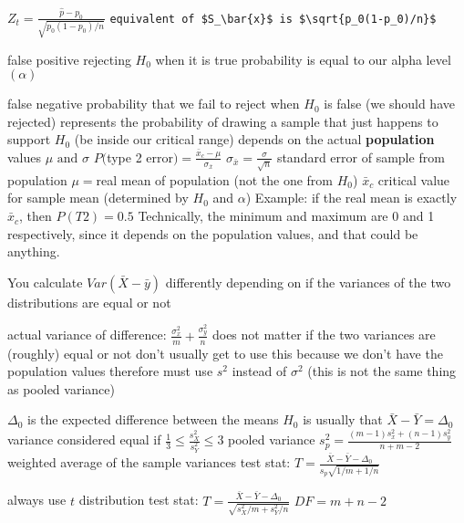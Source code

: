 \documentclass{article}
\begin{document}
\begin{multicols*}{2}
\begin{outline}[compactitem]
  \1 $Z_t=\frac{\hat{p}-p_0}{\sqrt{p_0(1-p_0)/n}}$
  \1 \verb|equivalent of $S_\bar{x}$ is $\sqrt{p_0(1-p_0)/n}$|

  \1 false positive
  \1 rejecting $H_0$ when it is true
  \1 probability is equal to our alpha level $(\alpha)$

  \1 false negative
  \1 probability that we fail to reject when $H_0$ is false (we should have rejected)
  \1 represents the probability of drawing a sample that just happens to support $H_0$ (be inside our critical range)
  \1 depends on the actual \textbf{population} values $\mu\mbox{ and }\sigma$
  \1 $P($type 2 error$)=\frac{\bar{x}_c-\mu}{\sigma_{\bar{x}}}$
    \2 $\sigma_{\bar{x}}=\frac{\sigma}{\sqrt{n}}$ standard error of sample from population
    \2 $\mu=$real mean of population (not the one from $H_0$)
    \2 $\bar{x}_c$ critical value for sample mean (determined by $H_0$ and $\alpha$)
  \1 Example: if the real mean is exactly $\bar{x}_c$, then $P(T2)=0.5$
  \1 Technically, the minimum and maximum are 0 and 1 respectively, since it depends on the population values, and that could be anything.


\noindent
You calculate $Var(\bar{X}-\bar{y})$ differently depending on if the variances of the two distributions are equal or not

  \1 actual variance of difference: $\frac{\sigma^2_x}{m} + \frac{\sigma^2_y}{n}$
    \2 does not matter if the two variances are (roughly) equal or not
    \2 don't usually get to use this because we don't have the population values
    \2 therefore must use $s^2$ instead of $\sigma^2$
    \2 (this is not the same thing as pooled variance)

  \1 $\Delta_0$ is the expected difference between the means
  \1 $H_0$ is usually that $\bar{X} - \bar{Y} = \Delta_0$
  \1 variance considered equal if $\frac{1}{3}\leq \frac{s_X^2}{s_Y^2} \leq 3$
  \1 pooled variance $s_p^2 = \frac{(m-1)s_x^2 + (n-1)s_y^2}{n+m-2}$
    \2 weighted average of the sample variances
  \1 test stat: $T = \frac{\bar{X}-\bar{Y}-\Delta_0}{s_p\sqrt{1/m+1/n}}$

  \1 always use $t$ distribution
  \1 test stat: $T = \frac{\bar{X}-\bar{Y}-\Delta_0}{\sqrt{s_X^2/m+s_Y^2/n}}$
  \1 $DF = m+n-2$


\end{outline}
\end{multicols*}
\end{document}
